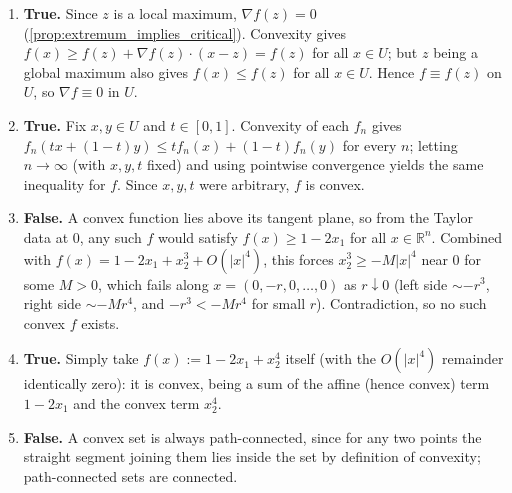 \begin{exercisesolution}
\begin{enumerate}[label=\textbf{(\alph*)}]
    \begin{remark}
    Worth noting: $x=0$ here is simultaneously a (non-strict) local \emph{minimum} too, since $f$
    is locally constant on the whole region $\{x_1 \leq \tfrac12\} \cap U$. This is exactly why
    the counterexample doesn't contradict \textbf{(b)}: $x=0$ is not a \emph{global} maximum of
    $f$ on $U$ (any point with $x_1 > \tfrac12$ has $f$ strictly larger), so \textbf{(b)}'s
    stronger hypothesis simply isn't triggered.
    \end{remark}
  \item \textbf{True.} Since $z$ is a local maximum, $\nabla f(z) = 0$
    (\cref{prop:extremum_implies_critical}). Convexity gives $f(x) \geq f(z) + \nabla f(z)\cdot(x-z)
    = f(z)$ for all $x \in U$; but $z$ being a global maximum also gives $f(x) \leq f(z)$ for all
    $x \in U$. Hence $f \equiv f(z)$ on $U$, so $\nabla f \equiv 0$ in $U$.
  \item \textbf{True.} Fix $x, y \in U$ and $t \in [0,1]$. Convexity of each $f_n$ gives
    $f_n(tx+(1-t)y) \leq tf_n(x) + (1-t)f_n(y)$ for every $n$; letting $n \to \infty$ (with
    $x,y,t$ fixed) and using pointwise convergence yields the same inequality for $f$. Since
    $x,y,t$ were arbitrary, $f$ is convex.
  \item \textbf{False.} A convex function lies above its tangent plane, so from the Taylor data at
    $0$, any such $f$ would satisfy $f(x) \geq 1-2x_1$ for all $x \in \mathbb{R}^n$. Combined with
    $f(x) = 1-2x_1+x_2^3+O(|x|^4)$, this forces $x_2^3 \geq -M|x|^4$ near $0$ for some $M>0$,
    which fails along $x = (0,-r,0,\dots,0)$ as $r \downarrow 0$ (left side $\sim -r^3$, right
    side $\sim -Mr^4$, and $-r^3 < -Mr^4$ for small $r$). Contradiction, so no such convex $f$
    exists.
  \item \textbf{True.} Simply take $f(x) := 1-2x_1+x_2^4$ itself (with the $O(|x|^4)$ remainder
    identically zero): it is convex, being a sum of the affine (hence convex) term $1-2x_1$ and
    the convex term $x_2^4$.
  \item \textbf{False.} A convex set is always path-connected, since for any two points the
    straight segment joining them lies inside the set by definition of convexity; path-connected
    sets are connected.
\end{enumerate}
\end{exercisesolution}


